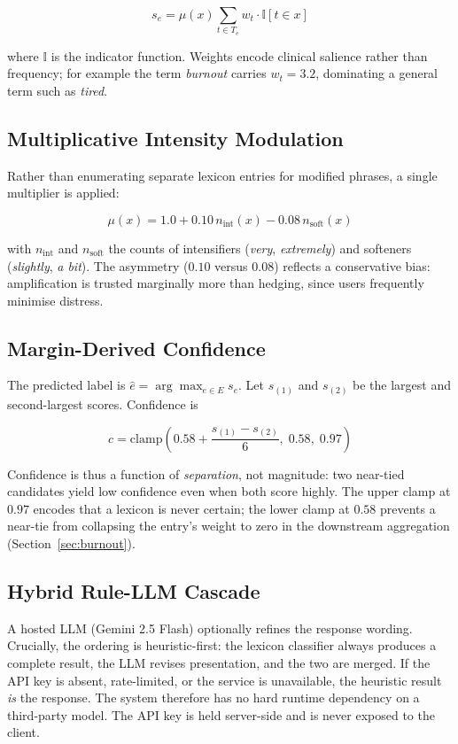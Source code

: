 \documentclass[conference]{IEEEtran}
\begin{document}
\begin{equation}
s_e = \mu(x) \sum_{t \in T_e} w_t \cdot \mathbb{I}[t \in x]
\end{equation}

where $\mathbb{I}$ is the indicator function. Weights encode clinical salience
rather than frequency; for example the term \textit{burnout} carries
$w_t = 3.2$, dominating a general term such as \textit{tired}.

\subsection{Multiplicative Intensity Modulation}
Rather than enumerating separate lexicon entries for modified phrases, a single
multiplier is applied:

\begin{equation}
\mu(x) = 1.0 + 0.10\,n_{\text{int}}(x) - 0.08\,n_{\text{soft}}(x)
\end{equation}

with $n_{\text{int}}$ and $n_{\text{soft}}$ the counts of intensifiers
(\textit{very}, \textit{extremely}) and softeners (\textit{slightly},
\textit{a bit}). The asymmetry ($0.10$ versus $0.08$) reflects a conservative
bias: amplification is trusted marginally more than hedging, since users
frequently minimise distress.

\subsection{Margin-Derived Confidence}
The predicted label is $\hat{e} = \arg\max_{e \in E} s_e$. Let $s_{(1)}$ and
$s_{(2)}$ be the largest and second-largest scores. Confidence is

\begin{equation}
c = \mathrm{clamp}\!\left(0.58 + \frac{s_{(1)} - s_{(2)}}{6},\; 0.58,\; 0.97\right)
\label{eq:conf}
\end{equation}

Confidence is thus a function of \emph{separation}, not magnitude: two
near-tied candidates yield low confidence even when both score highly. The
upper clamp at $0.97$ encodes that a lexicon is never certain; the lower clamp
at $0.58$ prevents a near-tie from collapsing the entry's weight to zero in
the downstream aggregation (Section~\ref{sec:burnout}).

\subsection{Hybrid Rule-LLM Cascade}
A hosted LLM (Gemini 2.5 Flash) optionally refines the response wording.
Crucially, the ordering is heuristic-first: the lexicon classifier always
produces a complete result, the LLM revises presentation, and the two are
merged. If the API key is absent, rate-limited, or the service is unavailable,
the heuristic result \emph{is} the response. The system therefore has no hard
runtime dependency on a third-party model. The API key is held server-side and
is never exposed to the client.
\end{document}
